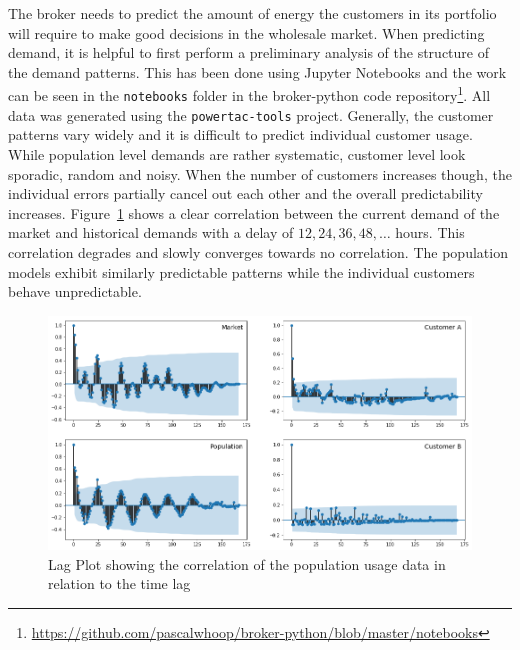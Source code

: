 
The broker needs to predict the amount of energy the customers in its portfolio will require to make good decisions in
the wholesale market.
When predicting demand, it is helpful to first perform a preliminary analysis of the structure of the demand patterns.
This has been done using Jupyter Notebooks and the work can be seen in the \texttt{notebooks} folder in the
broker-python code repository\footnote{\url{https://github.com/pascalwhoop/broker-python/blob/master/notebooks}}. All data was generated using the
\texttt{powertac-tools} project. Generally, the customer patterns vary widely and it is difficult to predict individual
customer usage. While population level demands are rather systematic, customer level look sporadic, random and noisy.
When the number of customers increases though, the individual errors partially cancel out each other and the overall
predictability increases.  Figure~\ref{fig:demandtimelag} shows a clear correlation between the current demand of the
market and historical demands with a delay of $12,24,36,48,\ldots$ hours. This correlation degrades and slowly
converges towards no correlation. The population models exhibit similarly predictable patterns while the individual
customers behave unpredictable.

\begin{figure}[h]
    \centering
    \includegraphics[width=1.0\linewidth]{img/demand_7.png}
    \caption{Lag Plot showing the correlation of the population usage data in relation to the time lag}
    \label{fig:demandtimelag}
\end{figure}


